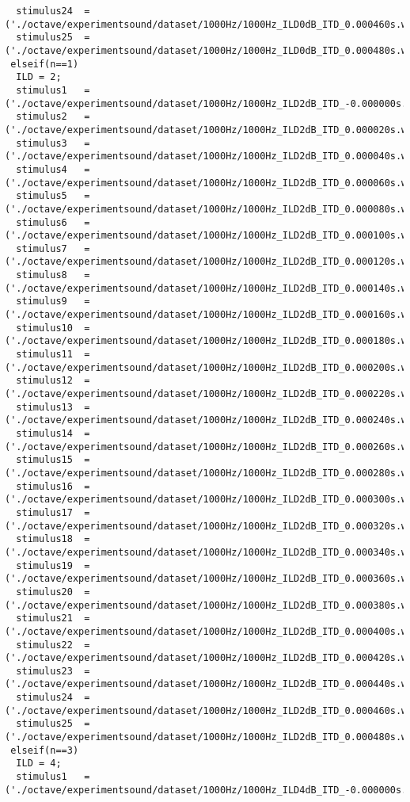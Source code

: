 {\begin{verbatim}
  stimulus24  =('./octave/experimentsound/dataset/1000Hz/1000Hz_ILD0dB_ITD_0.000460s.wav');
  stimulus25  =('./octave/experimentsound/dataset/1000Hz/1000Hz_ILD0dB_ITD_0.000480s.wav');
 elseif(n==1)
  ILD = 2;
  stimulus1   =('./octave/experimentsound/dataset/1000Hz/1000Hz_ILD2dB_ITD_-0.000000s.wav');
  stimulus2   =('./octave/experimentsound/dataset/1000Hz/1000Hz_ILD2dB_ITD_0.000020s.wav');
  stimulus3   =('./octave/experimentsound/dataset/1000Hz/1000Hz_ILD2dB_ITD_0.000040s.wav');
  stimulus4   =('./octave/experimentsound/dataset/1000Hz/1000Hz_ILD2dB_ITD_0.000060s.wav');
  stimulus5   =('./octave/experimentsound/dataset/1000Hz/1000Hz_ILD2dB_ITD_0.000080s.wav');
  stimulus6   =('./octave/experimentsound/dataset/1000Hz/1000Hz_ILD2dB_ITD_0.000100s.wav');
  stimulus7   =('./octave/experimentsound/dataset/1000Hz/1000Hz_ILD2dB_ITD_0.000120s.wav');
  stimulus8   =('./octave/experimentsound/dataset/1000Hz/1000Hz_ILD2dB_ITD_0.000140s.wav');
  stimulus9   =('./octave/experimentsound/dataset/1000Hz/1000Hz_ILD2dB_ITD_0.000160s.wav');
  stimulus10  =('./octave/experimentsound/dataset/1000Hz/1000Hz_ILD2dB_ITD_0.000180s.wav');
  stimulus11  =('./octave/experimentsound/dataset/1000Hz/1000Hz_ILD2dB_ITD_0.000200s.wav');
  stimulus12  =('./octave/experimentsound/dataset/1000Hz/1000Hz_ILD2dB_ITD_0.000220s.wav');
  stimulus13  =('./octave/experimentsound/dataset/1000Hz/1000Hz_ILD2dB_ITD_0.000240s.wav');
  stimulus14  =('./octave/experimentsound/dataset/1000Hz/1000Hz_ILD2dB_ITD_0.000260s.wav');
  stimulus15  =('./octave/experimentsound/dataset/1000Hz/1000Hz_ILD2dB_ITD_0.000280s.wav');
  stimulus16  =('./octave/experimentsound/dataset/1000Hz/1000Hz_ILD2dB_ITD_0.000300s.wav');
  stimulus17  =('./octave/experimentsound/dataset/1000Hz/1000Hz_ILD2dB_ITD_0.000320s.wav');
  stimulus18  =('./octave/experimentsound/dataset/1000Hz/1000Hz_ILD2dB_ITD_0.000340s.wav');
  stimulus19  =('./octave/experimentsound/dataset/1000Hz/1000Hz_ILD2dB_ITD_0.000360s.wav');
  stimulus20  =('./octave/experimentsound/dataset/1000Hz/1000Hz_ILD2dB_ITD_0.000380s.wav');
  stimulus21  =('./octave/experimentsound/dataset/1000Hz/1000Hz_ILD2dB_ITD_0.000400s.wav');
  stimulus22  =('./octave/experimentsound/dataset/1000Hz/1000Hz_ILD2dB_ITD_0.000420s.wav');
  stimulus23  =('./octave/experimentsound/dataset/1000Hz/1000Hz_ILD2dB_ITD_0.000440s.wav');
  stimulus24  =('./octave/experimentsound/dataset/1000Hz/1000Hz_ILD2dB_ITD_0.000460s.wav');
  stimulus25  =('./octave/experimentsound/dataset/1000Hz/1000Hz_ILD2dB_ITD_0.000480s.wav');
 elseif(n==3)
  ILD = 4;
  stimulus1   =('./octave/experimentsound/dataset/1000Hz/1000Hz_ILD4dB_ITD_-0.000000s.wav');

\end{verbatim}}
